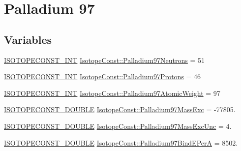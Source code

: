\hypertarget{group___isotope_const-_palladium-_pd97}{}\section{Palladium 97}
\label{group___isotope_const-_palladium-_pd97}
\subsection*{Variables}
\begin{DoxyCompactItemize}
\item 
\mbox{\hyperlink{group___isotope_const-_macros_ga5f18360b3e99483a35c32d789e62621c}{I\+S\+O\+T\+O\+P\+E\+C\+O\+N\+S\+T\+\_\+\+I\+NT}} \mbox{\hyperlink{group___isotope_const-_palladium-_pd97_ga8d47e525a37dcfc2626d00e4da4ca7d3}{Isotope\+Const\+::\+Palladium97\+Neutrons}} = 51
\item 
\mbox{\hyperlink{group___isotope_const-_macros_ga5f18360b3e99483a35c32d789e62621c}{I\+S\+O\+T\+O\+P\+E\+C\+O\+N\+S\+T\+\_\+\+I\+NT}} \mbox{\hyperlink{group___isotope_const-_palladium-_pd97_ga5d39628a4133b6afd8e2bba682aaae97}{Isotope\+Const\+::\+Palladium97\+Protons}} = 46
\item 
\mbox{\hyperlink{group___isotope_const-_macros_ga5f18360b3e99483a35c32d789e62621c}{I\+S\+O\+T\+O\+P\+E\+C\+O\+N\+S\+T\+\_\+\+I\+NT}} \mbox{\hyperlink{group___isotope_const-_palladium-_pd97_ga2e8f13d59b5db4f70bceaea8678579ca}{Isotope\+Const\+::\+Palladium97\+Atomic\+Weight}} = 97
\item 
\mbox{\hyperlink{group___isotope_const-_macros_ga8f45a7272ce02c0b4c65c44636ed719a}{I\+S\+O\+T\+O\+P\+E\+C\+O\+N\+S\+T\+\_\+\+D\+O\+U\+B\+LE}} \mbox{\hyperlink{group___isotope_const-_palladium-_pd97_ga6a670c4c345c8493e5beabf63b837b7d}{Isotope\+Const\+::\+Palladium97\+Mass\+Exc}} = -\/77805.
\item 
\mbox{\hyperlink{group___isotope_const-_macros_ga8f45a7272ce02c0b4c65c44636ed719a}{I\+S\+O\+T\+O\+P\+E\+C\+O\+N\+S\+T\+\_\+\+D\+O\+U\+B\+LE}} \mbox{\hyperlink{group___isotope_const-_palladium-_pd97_gaa3db39015dc64d067b769be482791927}{Isotope\+Const\+::\+Palladium97\+Mass\+Exc\+Unc}} = 4.
\item 
\mbox{\hyperlink{group___isotope_const-_macros_ga8f45a7272ce02c0b4c65c44636ed719a}{I\+S\+O\+T\+O\+P\+E\+C\+O\+N\+S\+T\+\_\+\+D\+O\+U\+B\+LE}} \mbox{\hyperlink{group___isotope_const-_palladium-_pd97_gaf43149884292d83b56522b373eb27914}{Isotope\+Const\+::\+Palladium97\+Bind\+E\+PerA}} = 8502.
\item 

\end{DoxyCompactItemize}
